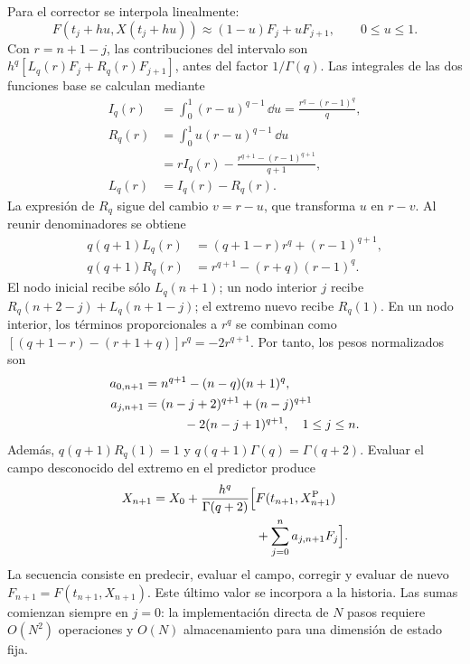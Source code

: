 Para el corrector se interpola linealmente:
\[
 F(t_j+hu,X(t_j+hu))\approx(1-u)F_j+uF_{j+1},
 \qquad 0\leq u\leq1.
\]
Con $r=n+1-j$, las contribuciones del intervalo son
$h^q[L_q(r)F_j+R_q(r)F_{j+1}]$, antes del factor $1/\Gamma(q)$. Las
integrales de las dos funciones base se calculan mediante
\begin{align}
 I_q(r)&=\int_0^1(r-u)^{q-1}\,\dd u
       =\frac{r^q-(r-1)^q}{q},\nonumber\\
 R_q(r)&=\int_0^1u(r-u)^{q-1}\,\dd u\nonumber\\
       &=rI_q(r)-\frac{r^{q+1}-(r-1)^{q+1}}{q+1},\nonumber\\
 L_q(r)&=I_q(r)-R_q(r).
 \label{bre:num:pesos-integrales}
\end{align}
La expresión de $R_q$ sigue del cambio $v=r-u$, que transforma $u$ en
$r-v$. Al reunir denominadores se obtiene
\begin{align*}
 q(q+1)L_q(r)&=(q+1-r)r^q+(r-1)^{q+1},\\
 q(q+1)R_q(r)&=r^{q+1}-(r+q)(r-1)^q.
\end{align*}
El nodo inicial recibe sólo $L_q(n+1)$; un nodo interior $j$ recibe
$R_q(n+2-j)+L_q(n+1-j)$; el extremo nuevo recibe $R_q(1)$. En un nodo
interior, los términos proporcionales a $r^q$ se combinan como
$[(q+1-r)-(r+1+q)]r^q=-2r^{q+1}$. Por tanto, los pesos normalizados son
\begin{align}
 a_{0,n+1}&=n^{q+1}-(n-q)(n+1)^q,\nonumber\\
 a_{j,n+1}&=(n-j+2)^{q+1}+(n-j)^{q+1}\nonumber\\
 &\hspace{1.1cm}-2(n-j+1)^{q+1},\quad 1\leq j\leq n.
 \label{bre:num:pesos-corrector}
\end{align}
Además, $q(q+1)R_q(1)=1$ y
$q(q+1)\Gamma(q)=\Gamma(q+2)$. Evaluar el campo desconocido del extremo en
el predictor produce
\begin{equation}
 \begin{split}
 X_{n+1}=X_0+\frac{h^q}{\Gamma(q+2)}\Bigl[
 &F(t_{n+1},X_{n+1}^{\mathrm P})\\
 &+\sum_{j=0}^{n}a_{j,n+1}F_j\Bigr].
 \end{split}
 \label{bre:num:corrector}
\end{equation}
La secuencia consiste en predecir, evaluar el campo, corregir y evaluar de
nuevo $F_{n+1}=F(t_{n+1},X_{n+1})$. Este último valor se incorpora a la
historia. Las sumas comienzan siempre en $j=0$: la implementación directa de
$N$ pasos requiere $O(N^2)$ operaciones y $O(N)$ almacenamiento para una
dimensión de estado fija.

